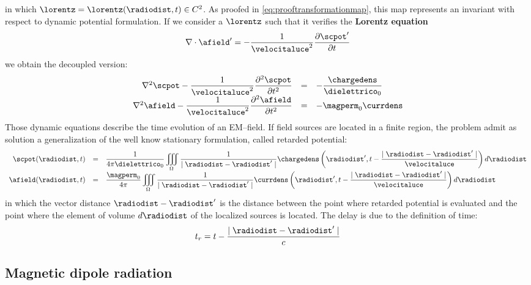 in which $\lorentz = \lorentz(\radiodist,t) \in C^2$. As proofed in \ref{eq:prooftransformationmap}, this map represents an invariant with respect to dynamic potential formulation. If we consider a $\lorentz$ such that it verifies the \textbf{Lorentz equation}
\begin{equation}
\nabla \cdot \afield' = - \dfrac{1}{\velocitaluce^2} \partialtarg{\scpot'}
\end{equation}
we obtain the decoupled version:
\begin{equation}
\begin{array}{rcl}
\nabla^2 \scpot - \dfrac{1}{\velocitaluce^2} \partialttarg{\scpot} & = & - \dfrac{\chargedens}{\dielettrico_0} \\
\nabla^2 \afield - \dfrac{1}{\velocitaluce^2} \partialttarg{\afield} & = & - \magperm_0 \currdens 
\end{array}
\end{equation}
Those dynamic equations describe the time evolution of an EM--field. If field sources are located in a finite region, the problem admit as solution a generalization of the well know stationary formulation, called retarded potential:
\begin{equation}
\begin{array}{rcl}
\scpot(\radiodist,t) & = & \dfrac{1}{4\pi \dielettrico_0} \displaystyle\iiint\limits_{\Omega} \dfrac{1}{\mid \radiodist - \radiodist' \mid} \chargedens\left( \radiodist',t-\dfrac{\mid \radiodist - \radiodist' \mid}{\velocitaluce} \right) d\radiodist   \\
\afield(\radiodist,t) & = & \dfrac{\magperm_0}{4\pi} \displaystyle\iiint\limits_{\Omega} \dfrac{1}{\mid \radiodist - \radiodist' \mid} \currdens\left( \radiodist',t-\dfrac{\mid \radiodist - \radiodist' \mid}{\velocitaluce} \right) d\radiodist 
\end{array}
\end{equation}
in which the vector distance ${\radiodist - \radiodist'}$ is the distance between the point where retarded potential is evaluated and the point where the element of volume $d\radiodist$ of the localized sources is located. The delay is due to the definition of time:
\[
t_r = t - \dfrac{\mid \radiodist - \radiodist' \mid}{c}
\]

\subsection{Magnetic dipole radiation}

